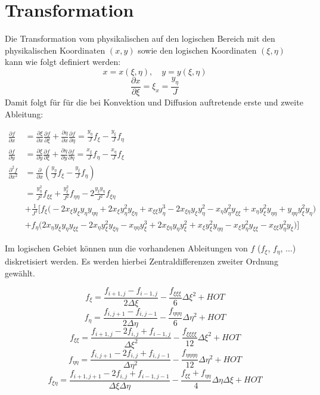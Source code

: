 \documentclass[11pt, ngerman,colorback,accentcolor=tud2d]{tudreport}
\newcommand{\pder}[2][]{\frac{\partial#1}{\partial#2}}
\newcommand{\pderf}[1]{\frac{\partial f}{\partial#1}}
\newcommand{\pderfs}[1]{\frac{\partial^2 f}{\partial#1}}
\newcommand{\fxi}{f_{\xi}}
\newcommand{\fxxi}{f_{\xi\xi}}
\newcommand{\fxxxxi}{f_{\xi\xi\xi\xi}}
\newcommand{\xxi}{x_{\xi}}
\newcommand{\xxxi}{x_{\xi\xi}}
\newcommand{\yxi}{y_{\xi}}
\newcommand{\yxxi}{y_{\xi\xi}}
\newcommand{\feta}{f_{\eta}}
\newcommand{\feeta}{f_{\eta\eta}}
\newcommand{\feeeeta}{f_{\eta\eta\eta\eta}}
\newcommand{\xeta}{x_{\eta}}
\newcommand{\xeeta}{x_{\eta\eta}}
\newcommand{\yeta}{y_{\eta}}
\newcommand{\yeeta}{y_{\eta\eta}}
\begin{document}
\chapter{Transformation}

Die Transformation vom physikalischen auf den logischen Bereich mit
den physikalischen Koordinaten $(x, y)$ sowie den logischen
Koordinaten $(\xi, \eta)$ kann wie folgt definiert werden:
\begin{equation}
  x=x(\xi,\eta),\quad y=y(\xi, \eta)
\end{equation}
\begin{equation}
  \pder[x]{\xi}=\xi_x=\frac{y_{\eta}}{J}
\end{equation}
Damit folgt für für die bei Konvektion und Diffusion auftretende
erste und zweite Ableitung:

\begin{align*}
  \pderf{x}&=\pder[\xi]{x}\pderf{\xi}+\pder[\eta]{x}\pderf{\eta}
  =\frac{y_{\eta}}{J} f_{\xi} - \frac{y_{\xi}}{J}f_{\eta}\\
  \pderf{y}&=\pder[\xi]{y}\pderf{\xi}+\pder[\eta]{y}\pderf{\eta}
  =\frac{x_{\xi}}{J}f_{\eta}-\frac{x_{\eta}}{J} f_{\xi} \\
  \pderfs{x^2} &= \pder{x}\left({\frac{y_{\eta}}{J} f_{\xi} - \frac{y_{\xi}}{J}f_{\eta}}\right)\\
               &= \frac{\yeta^2}{J^2} \fxxi + \frac{\yxi^2}{J^2} \feeta-2 \frac{\yxi \yeta}{J^2} f_{\xi\eta}\\
               &+ \frac{1}{J^3} \Big[\fxi
  \Big(-2\xxi\yxi\yeta\yeeta + 2\xxi\yeta^2y_{\xi\eta} + \xxxi \yeta^3 - 2x_{\xi \eta}\yxi\yeta^2
  -\xeta\yeta^2\yxxi + \xeta\yxi^2\yeeta + \yeeta\yxi^2\yeta\Big)\\
  &+ \feta\Big(
  2\xeta\yxi\yeta\yxxi - 2\xeta\yxi^2y_{\xi\eta} -\xeeta\yxi^3+2x_{\xi\eta}\yeta\yxi^2
  +\xxi\yxi^2\yeeta-\xxi\yeta^2\yxxi-\xxxi\yeta^2\yxi
\Big)\Big]
\end{align*}


Im logischen Gebiet können nun die vorhandenen Ableitungen von $f$
($f_{\xi}$, $f_{\eta}$, $\dots$) diskretisiert werden.
Es werden hierbei Zentraldifferenzen zweiter Ordnung gewählt.

\begin{equation}
  f_{\xi}=\frac{f_{i+1,j}-f_{i-1,j}}{2\Delta \xi} - \frac{f_{\xi\xi\xi}}{6}\Delta \xi^2 + HOT
\end{equation}
\begin{equation}
  f_{\eta}=\frac{f_{i,j+1}-f_{i,j-1}}{2 \Delta \eta} - \frac{f_{\eta\eta\eta}}{6}\Delta \eta^2 + HOT
\end{equation}
\begin{equation}
  \fxxi=\frac{f_{i+1,j}-2f_{i,j}+f_{i-1,j}}{\Delta \xi^2} -\frac{\fxxxxi}{12} \Delta \xi^2 + HOT
\end{equation}
\begin{equation}
  \feeta=\frac{f_{i,j+1}-2f_{i,j}+f_{i,j-1}}{\Delta \eta^2} -\frac{\feeeeta}{12} \Delta \eta^2 + HOT
\end{equation}
\begin{equation}
  f_{\xi\eta}=\frac{f_{i+1,j+1}-2f_{i,j}+f_{i-1,j-1}}{\Delta \xi\Delta \eta} -\frac{\fxxi+\feeta}{4} \Delta \eta \Delta \xi + HOT
\end{equation}
\end{document}

